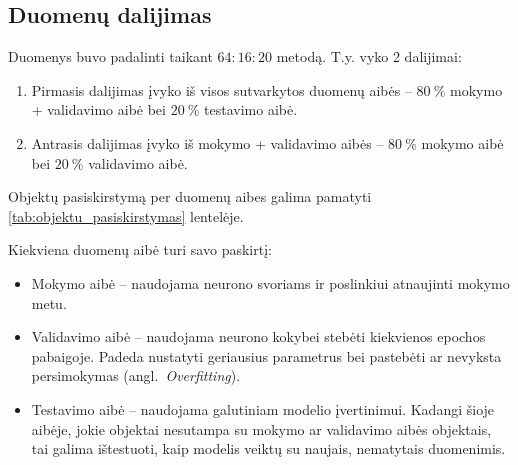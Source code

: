 \subsection{Duomenų dalijimas}
\label{subsec:duomenu_dalijimas}

Duomenys buvo padalinti taikant $64{:}16{:}20$ metodą. T.y. vyko 2 dalijimai:
\begin{enumerate}
    \item Pirmasis dalijimas įvyko iš visos sutvarkytos duomenų aibės – $80\ \%$ mokymo + validavimo aibė bei $20\ \%$ testavimo aibė.
    \item Antrasis dalijimas įvyko iš mokymo + validavimo aibės – $80\ \%$ mokymo aibė bei $20\ \%$ validavimo aibė.
\end{enumerate}

Objektų pasiskirstymą per duomenų aibes galima pamatyti \ref{tab:objektu_pasiskirstymas} lentelėje.



Kiekviena duomenų aibė turi savo paskirtį:
\begin{itemize}
    \item Mokymo aibė – naudojama neurono svoriams ir poslinkiui atnaujinti mokymo metu.
    \item Validavimo aibė – naudojama neurono kokybei stebėti kiekvienos epochos pabaigoje. Padeda nustatyti geriausius parametrus bei pastebėti ar nevyksta persimokymas (angl.~\textit{Overfitting}).
    \item Testavimo aibė – naudojama galutiniam modelio įvertinimui. Kadangi šioje aibėje, jokie objektai nesutampa su mokymo ar validavimo aibės objektais, tai galima ištestuoti, kaip modelis veiktų su naujais, nematytais duomenimis.
\end{itemize}